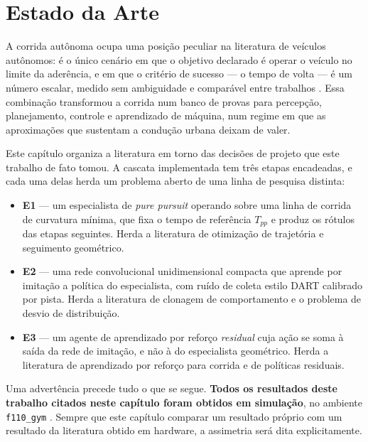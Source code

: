 \chapter{Estado da Arte}\label{cap:estArte}

A corrida autônoma ocupa uma posição peculiar na literatura de veículos
autônomos: é o único cenário em que o objetivo declarado é operar o veículo no
limite da aderência, e em que o critério de sucesso --- o tempo de volta --- é
um número escalar, medido sem ambiguidade e comparável entre trabalhos
\cite{Betz2022Survey}. Essa combinação transformou a corrida num banco de
provas para percepção, planejamento, controle e aprendizado de máquina, num
regime em que as aproximações que sustentam a condução urbana deixam de valer.

Este capítulo organiza a literatura em torno das decisões de projeto que este
trabalho de fato tomou. A cascata implementada tem três etapas encadeadas, e
cada uma delas herda um problema aberto de uma linha de pesquisa distinta:

\begin{itemize}
    \item \textbf{E1} --- um especialista de \textit{pure pursuit} operando
          sobre uma linha de corrida de curvatura mínima, que fixa o tempo de
          referência $T_{pp}$ e produz os rótulos das etapas seguintes. Herda a
          literatura de otimização de trajetória e seguimento geométrico.
    \item \textbf{E2} --- uma rede convolucional unidimensional compacta que
          aprende por imitação a política do especialista, com ruído de coleta
          estilo DART calibrado por pista. Herda a literatura de clonagem de
          comportamento e o problema de desvio de distribuição.
    \item \textbf{E3} --- um agente de aprendizado por reforço \textit{residual}
          cuja ação se soma à saída da rede de imitação, e não à do especialista
          geométrico. Herda a literatura de aprendizado por reforço para corrida
          e de políticas residuais.
\end{itemize}

Uma advertência precede tudo o que se segue. \textbf{Todos os resultados deste
trabalho citados neste capítulo foram obtidos em simulação}, no ambiente
\texttt{f110\_gym} \cite{OKelly2020F1TENTH}. Sempre que este capítulo comparar um
resultado próprio com um resultado da literatura obtido em hardware, a
assimetria será dita explicitamente.


